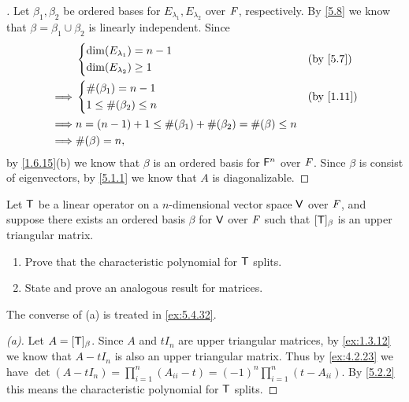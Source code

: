 \begin{proof}[]
  Let \(\beta_1, \beta_2\) be ordered bases for \(E_{\lambda_1}, E_{\lambda_2}\) over \(\mathit{F}\), respectively.
  By \cref{5.8} we know that \(\beta = \beta_1 \cup \beta_2\) is linearly independent.
  Since
  \begin{align*}
             & \begin{dcases}
                 \dim(E_{\lambda_1}) = n - 1 \\
                 \dim(E_{\lambda_2}) \geq 1
               \end{dcases}                                    &  & \text{(by \cref{5.7})}       \\
    \implies & \begin{dcases}
                 \#(\beta_1) = n - 1 \\
                 1 \leq \#(\beta_2) \leq n
               \end{dcases}                                         &  & \text{(by \cref{1.11})} \\
    \implies & n = (n - 1) + 1 \leq \#(\beta_1) + \#(\beta_2) = \#(\beta) \leq n                 \\
    \implies & \#(\beta) = n,
  \end{align*}
  by \cref{1.6.15}(b) we know that \(\beta\) is an ordered basis for \(\mathsf{F}^n\) over \(\mathit{F}\).
  Since \(\beta\) is consist of eigenvectors, by \cref{5.1.1} we know that \(A\) is diagonalizable.
\end{proof}

\begin{ex}\label{ex:5.2.9}
  Let \(\mathsf{T}\) be a linear operator on a \(n\)-dimensional vector space \(\mathsf{V}\) over \(\mathit{F}\), and suppose there exists an ordered basis \(\beta\) for \(\mathsf{V}\) over \(\mathit{F}\) such that \([\mathsf{T}]_{\beta}\) is an upper triangular matrix.
  \begin{enumerate}
    \item Prove that the characteristic polynomial for \(\mathsf{T}\) splits.
    \item State and prove an analogous result for matrices.
  \end{enumerate}
  The converse of (a) is treated in \cref{ex:5.4.32}.
\end{ex}

\begin{proof}[(a)]
  Let \(A = [\mathsf{T}]_{\beta}\).
  Since \(A\) and \(t I_n\) are upper triangular matrices, by \cref{ex:1.3.12} we know that \(A - t I_n\) is also an upper triangular matrix.
  Thus by \cref{ex:4.2.23} we have \(\det(A - t I_n) = \prod_{i = 1}^n (A_{i i} - t) = (-1)^n \prod_{i = 1}^n (t - A_{i i})\).
  By \cref{5.2.2} this means the characteristic polynomial for \(\mathsf{T}\) splits.
\end{proof}

